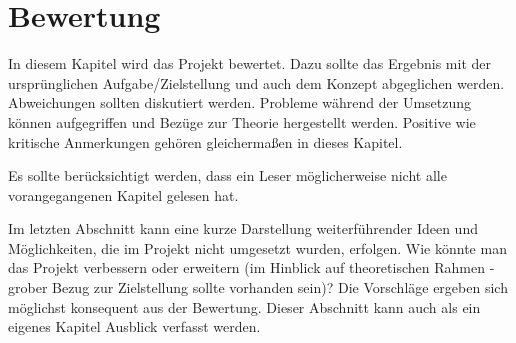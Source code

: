 \chapter{Bewertung}

In diesem Kapitel wird das Projekt bewertet. Dazu sollte das Ergebnis mit der ursprünglichen Aufgabe/Zielstellung und auch dem Konzept abgeglichen werden. Abweichungen sollten diskutiert werden. Probleme während der Umsetzung können aufgegriffen und Bezüge zur Theorie hergestellt werden. Positive wie kritische Anmerkungen gehören gleichermaßen in dieses Kapitel.

Es sollte berücksichtigt werden, dass ein Leser möglicherweise nicht alle vorangegangenen Kapitel gelesen hat.

Im letzten Abschnitt kann eine kurze Darstellung weiterführender Ideen und Möglichkeiten, die im Projekt nicht umgesetzt wurden, erfolgen. Wie könnte man das Projekt verbessern oder erweitern (im Hinblick auf theoretischen Rahmen - grober Bezug zur Zielstellung sollte vorhanden sein)? Die Vorschläge ergeben sich möglichst konsequent aus der Bewertung. Dieser Abschnitt kann auch als ein eigenes Kapitel Ausblick verfasst werden.